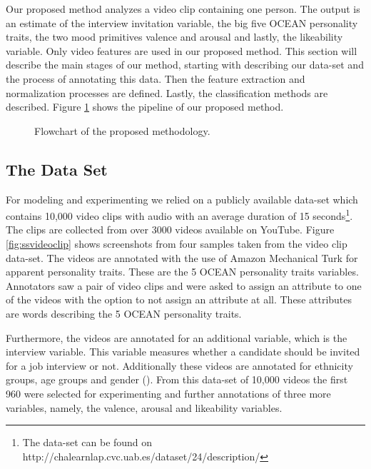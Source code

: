 
Our proposed method analyzes a video clip containing one person. The output is an estimate of the interview invitation variable, the big five OCEAN personality traits, the two mood primitives valence and arousal and lastly, the likeability variable. Only video features are used in our proposed method. This section will describe the main stages of our method, starting with describing our data-set and the process of annotating this data. Then the feature extraction and normalization processes are defined. Lastly, the classification methods are described. Figure \ref{fig:proposedmethod} shows the pipeline of our proposed method.

\begin{figure}[h]
  \centering
  
  \caption{Flowchart of the proposed methodology.}
  \label{fig:proposedmethod}
\end{figure}

\subsection{The Data Set}
\label{subsection:dataset}

For modeling and experimenting we relied on a publicly available data-set which contains 10,000 video clips with audio with an average duration of 15 seconds\footnote{The data-set can be found on http://chalearnlap.cvc.uab.es/dataset/24/description/}. The clips are collected from over 3000 videos available on YouTube. Figure \ref{fig:ssvideoclip} shows screenshots from four samples taken from the video clip data-set. The videos are annotated with the use of Amazon Mechanical Turk for apparent personality traits. These are the 5 OCEAN personality traits variables. Annotators saw a pair of video clips and were asked to assign an attribute to one of the videos with the option to not assign an attribute at all. These attributes are words describing the 5 OCEAN personality traits. 

Furthermore, the videos are annotated for an additional variable, which is the interview variable. This variable measures whether a candidate should be invited for a job interview or not. Additionally these videos are annotated for ethnicity groups, age groups and gender (\cite{escalante2018explaining}). From this data-set of 10,000 videos the first 960 were selected for experimenting and further annotations of three more variables, namely, the valence, arousal and likeability variables. 


